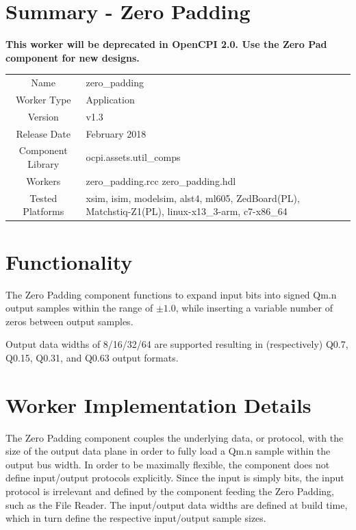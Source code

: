 \documentclass{article}
\author{} %
\date{Version \docVersion} %
\title{\docTitle}
\def\docVersion{1.3}
\def\comp{zero\_padding}
\def\Comp{Zero Padding}
\begin{document}
\section*{Summary - \Comp}
\textbf{This worker will be deprecated in OpenCPI 2.0. Use the Zero Pad component for new designs.}\\

\begin{tabular}{|c|M{13.5cm}|}
	\hline
	                  &                                                                                            \\
	\hline
	Name              & \comp                                                                                      \\
	\hline
	Worker Type       & Application                                                                                \\
	\hline
	Version           & v\docVersion \\
	\hline
	Release Date      & February 2018 \\
	\hline
	Component Library & ocpi.assets.util\_comps                                                                     \\
	\hline
	Workers           & \comp.rcc \comp.hdl                                                                        \\
	\hline
	Tested Platforms  & xsim, isim, modelsim, alst4, ml605, ZedBoard(PL), Matchstiq-Z1(PL), linux-x13\_3-arm, c7-x86\_64 \\
	\hline
\end{tabular}

\section*{Functionality}
\begin{flushleft}
	The {\Comp} component functions to expand input bits into signed Qm.n output samples within the range of $\pm1.0$, while inserting a variable number of zeros between output samples.\medskip

	Output data widths of 8/16/32/64 are supported resulting in (respectively) Q0.7, Q0.15, Q0.31, and Q0.63 output formats.
\end{flushleft}

\section*{Worker Implementation Details}
\begin{flushleft}
	The {\Comp} component couples the underlying data, or protocol, with the size of the output data plane in order to fully load a Qm.n sample within the output bus width. In order to be maximally flexible, the component does not define input/output protocols explicitly. Since the input is simply bits, the input protocol is irrelevant and defined by the component feeding the Zero Padding, such as the File Reader. The input/output data widths are defined at build time, which in turn define the respective input/output sample sizes.
\end{flushleft}
\end{document}
